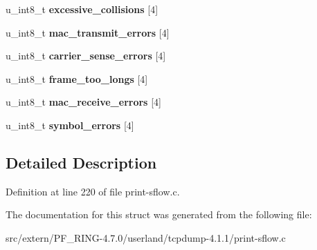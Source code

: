 \begin{DoxyCompactItemize}
\item 
\hypertarget{structsflow__ethernet__counter__t_a2e20c535bf0d6499fbec0d22969a5f38}{
u\_\-int8\_\-t {\bfseries excessive\_\-collisions} \mbox{[}4\mbox{]}}
\label{structsflow__ethernet__counter__t_a2e20c535bf0d6499fbec0d22969a5f38}

\item 
\hypertarget{structsflow__ethernet__counter__t_acf243d99e92737316a40eae9bbe6615d}{
u\_\-int8\_\-t {\bfseries mac\_\-transmit\_\-errors} \mbox{[}4\mbox{]}}
\label{structsflow__ethernet__counter__t_acf243d99e92737316a40eae9bbe6615d}

\item 
\hypertarget{structsflow__ethernet__counter__t_a538f058b46e6dad89d9acb45aef34e4a}{
u\_\-int8\_\-t {\bfseries carrier\_\-sense\_\-errors} \mbox{[}4\mbox{]}}
\label{structsflow__ethernet__counter__t_a538f058b46e6dad89d9acb45aef34e4a}

\item 
\hypertarget{structsflow__ethernet__counter__t_ac5511fb12288d22a6d636a2d77200d99}{
u\_\-int8\_\-t {\bfseries frame\_\-too\_\-longs} \mbox{[}4\mbox{]}}
\label{structsflow__ethernet__counter__t_ac5511fb12288d22a6d636a2d77200d99}

\item 
\hypertarget{structsflow__ethernet__counter__t_a4ea1a02f6ce3725dab65f35ebdee7c86}{
u\_\-int8\_\-t {\bfseries mac\_\-receive\_\-errors} \mbox{[}4\mbox{]}}
\label{structsflow__ethernet__counter__t_a4ea1a02f6ce3725dab65f35ebdee7c86}

\item 
\hypertarget{structsflow__ethernet__counter__t_a66aa2ddcf6eb7d945aa8500cfefec3d1}{
u\_\-int8\_\-t {\bfseries symbol\_\-errors} \mbox{[}4\mbox{]}}
\label{structsflow__ethernet__counter__t_a66aa2ddcf6eb7d945aa8500cfefec3d1}

\end{DoxyCompactItemize}


\subsection{Detailed Description}


Definition at line 220 of file print-\/sflow.c.



The documentation for this struct was generated from the following file:\begin{DoxyCompactItemize}
\item 
src/extern/PF\_\-RING-\/4.7.0/userland/tcpdump-\/4.1.1/print-\/sflow.c\end{DoxyCompactItemize}
